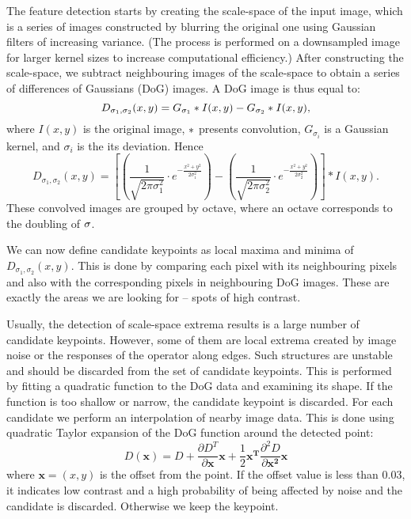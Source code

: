 The feature detection starts by creating the scale-space of the input image, 
which is a series of images constructed by blurring the original one using Gaussian filters of increasing variance. 
(The process is performed on a downsampled image for larger kernel sizes to increase computational efficiency.)
After constructing the scale-space, we subtract neighbouring images of the scale-space to obtain a series of differences of Gaussians (DoG) images. 
A DoG image is thus equal to: 
\[ D_{\sigma_1, \sigma_2}(x, y) = G_{\sigma_1} * I(x, y) - G_{\sigma_2} * I(x, y), \]
where $I(x, y)$ is the original image, $*$ presents convolution, $G_{\sigma_i}$ is a Gaussian kernel, and $\sigma_i$ is the its deviation. 
Hence
\[
D_{\sigma_1, \sigma_2}(x, y) = 
\left[
\left( \frac{1}{\sqrt{2\pi \sigma _1^{2}}} \cdot e^{-\frac{x^{2}+y^{2}}{2\sigma_1^{2}} } \right) -
\left( \frac{1}{\sqrt{2\pi \sigma _2^{2}}} \cdot e^{-\frac{x^{2}+y^{2}}{2\sigma_2^{2}} } \right )
 \right ] * I(x, y).
\]
 These convolved images are grouped by octave, where an octave corresponds to the doubling of $\mathbf{\sigma}$.

 We can now define candidate keypoints as local maxima and minima of $D_{\sigma_1,\sigma_2}(x, y)$.
This is done by comparing each pixel with its neighbouring pixels and also with the corresponding pixels in neighbouring DoG images. 
These are exactly the areas we are looking for -- spots of high contrast. %

Usually, the detection of scale-space extrema results is a large number of candidate keypoints.
However, some of them are local extrema created by image noise or the responses of the operator along edges. 
Such structures are unstable and should be discarded from the set of candidate keypoints.
This is performed by fitting a quadratic function to the DoG data and examining its shape. 
If the function is too shallow or narrow, the candidate keypoint is discarded. 
For each candidate we perform an interpolation of nearby image data.
This is done using quadratic Taylor expansion of the DoG function around the detected point:
\[
D(\mathbf{x}) = D + \frac{\partial D^{T}}{\partial \mathbf{x}}\mathbf{x} + \frac{1}{2}\mathbf{x^{T}}\frac{\partial ^{2}D}{\partial \mathbf{x^{2}}}\mathbf{x}
\]
where $\mathbf{x} = (x, y)$ is the offset from the point.
If the offset value is less than $0.03$, it indicates low contrast and a high probability of being affected by noise and the candidate is discarded.
Otherwise we keep the keypoint.


